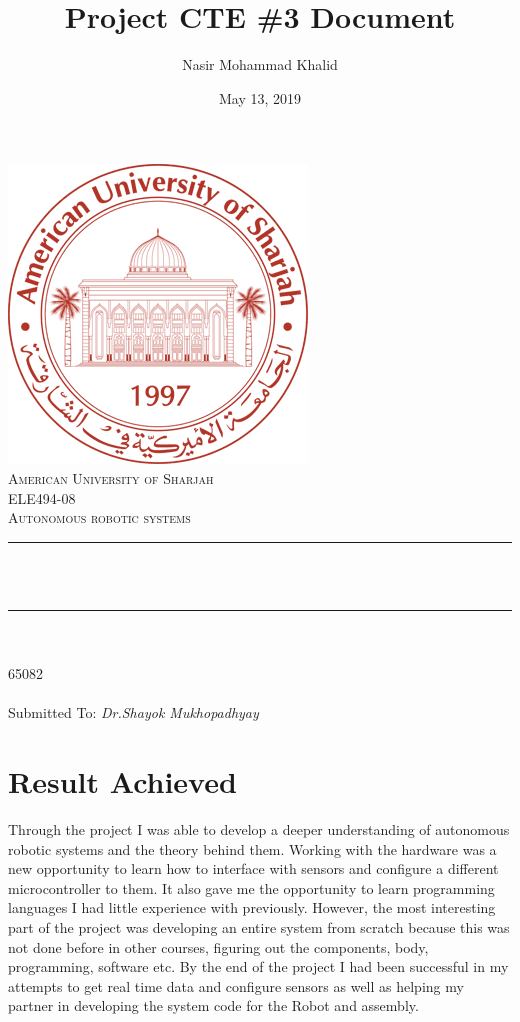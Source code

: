 \documentclass[a4paper, 12pt]{article}
\title{Project CTE \#3 Document}
\author{Nasir Mohammad Khalid}
\date{May 13, 2019}
\makeatletter
\let\thetitle\@title
\let\theauthor\@author
\let\thedate\@date
\makeatother
\begin{document}
 
    \begin{titlepage}
        \centering
        \vspace*{0.5 cm}
        \includegraphics[scale = 0.60]{logo.png}\\[1.0 cm]	%
        \textsc{\LARGE American University of Sharjah}\\[1.0 cm]
        \textsc{\Large ELE494-08}\\[0.2 cm]	
        \textsc{\Large Autonomous robotic systems}\\[0.5 cm]			%
        \rule{\linewidth}{0.2 mm} \\[0.4 cm]
        { \huge \bfseries \thetitle}\\
        \rule{\linewidth}{0.2 mm} \\[1.5 cm]
        
        \textsc{\Large{\theauthor}}\\[0.3 cm]
        \textsc{\Large{65082}}\\[0.3 cm]
        \textsc{\Large{\thedate}}\\[1.5 cm]

        \textmd{Submitted To: \itshape{Dr.Shayok Mukhopadhyay}}
    \end{titlepage}

    \section{Result Achieved}

    Through the project I was able to develop a deeper understanding of autonomous robotic systems and the theory behind them.
    Working with the hardware was a new opportunity to learn how to interface with sensors and configure a different microcontroller to them.
    It also gave me the opportunity to learn programming languages I had little experience with previously. However, the most interesting
    part of the project was developing an entire system from scratch because this was not done before in other courses, figuring out the components,
    body, programming, software etc. By the end of the project I had been successful in my attempts to get real time data and configure sensors
    as well as helping my partner in developing the system code for the Robot and assembly.
\end{document}

